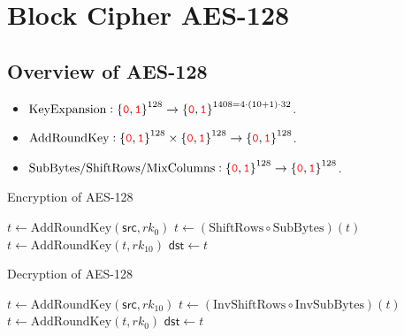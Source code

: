 \chapter{Block Cipher AES-128}

\section{Overview of AES-128}

\begin{itemize}
	\item $\text{KeyExpansion}:\set{\textcolor{red}{\texttt{0}},\textcolor{red}{\texttt{1}}}^{128}\to\set{\textcolor{red}{\texttt{0}},\textcolor{red}{\texttt{1}}}^{1408=4\cdot(10+1)\cdot32}$.
	\item $\text{AddRoundKey}:\set{\textcolor{red}{\texttt{0}},\textcolor{red}{\texttt{1}}}^{128}\times\set{\textcolor{red}{\texttt{0}},\textcolor{red}{\texttt{1}}}^{128}\to\set{\textcolor{red}{\texttt{0}},\textcolor{red}{\texttt{1}}}^{128}$.
	\item $\text{SubBytes/ShiftRows/MixColumns}:\set{\textcolor{red}{\texttt{0}},\textcolor{red}{\texttt{1}}}^{128}\to\set{\textcolor{red}{\texttt{0}},\textcolor{red}{\texttt{1}}}^{128}$.
\end{itemize}

\begin{algorithm}[H]
	\caption{Encryption of AES-128}
	
	\BlankLine
	$t \leftarrow \text{AddRoundKey}(\mathsf{src}, rk_0)$\;
	$t \leftarrow (\text{ShiftRows}\circ\text{SubBytes})(t)$\;
	$t \leftarrow \text{AddRoundKey}(t, rk_{10})$\;
	$\mathsf{dst} \leftarrow t$\;
	\;
\end{algorithm}

\begin{algorithm}[H]
	\caption{Decryption of AES-128}
	
	\BlankLine
	$t \leftarrow \text{AddRoundKey}(\mathsf{src}, rk_{10})$\;
	$t \leftarrow (\text{InvShiftRows}\circ\text{InvSubBytes})(t)$\;
	$t \leftarrow \text{AddRoundKey}(t, rk_{0})$\;
	$\mathsf{dst} \leftarrow t$\;
	\;
\end{algorithm}

